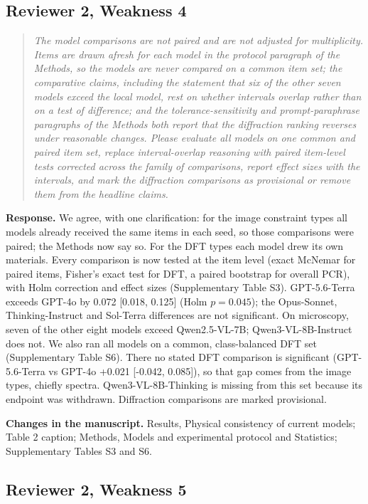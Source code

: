 \documentclass[11pt,a4paper]{article}
\newenvironment{reviewer}{\begin{quote}\itshape\small}{\end{quote}}
\begin{document}
\subsection*{Reviewer 2, Weakness 4}

\begin{reviewer}The model comparisons are not paired and are not adjusted for multiplicity. Items are drawn afresh for each model in the protocol paragraph of the Methods, so the models are never compared on a common item set; the comparative claims, including the statement that six of the other seven models exceed the local model, rest on whether intervals overlap rather than on a test of difference; and the tolerance-sensitivity and prompt-paraphrase paragraphs of the Methods both report that the diffraction ranking reverses under reasonable changes. Please evaluate all models on one common and paired item set, replace interval-overlap reasoning with paired item-level tests corrected across the family of comparisons, report effect sizes with the intervals, and mark the diffraction comparisons as provisional or remove them from the headline claims.\end{reviewer}

\textbf{Response.} We agree, with one clarification: for the image constraint types all models already received the same items in each seed, so those comparisons were paired; the Methods now say so. For the DFT types each model drew its own materials. Every comparison is now tested at the item level (exact McNemar for paired items, Fisher's exact test for DFT, a paired bootstrap for overall PCR), with Holm correction and effect sizes (Supplementary Table S3). GPT-5.6-Terra exceeds GPT-4o by 0.072 [0.018, 0.125] (Holm $p=0.045$); the Opus-Sonnet, Thinking-Instruct and Sol-Terra differences are not significant. On microscopy, seven of the other eight models exceed Qwen2.5-VL-7B; Qwen3-VL-8B-Instruct does not. We also ran all models on a common, class-balanced DFT set (Supplementary Table S6). There no stated DFT comparison is significant (GPT-5.6-Terra vs GPT-4o +0.021 [-0.042, 0.085]), so that gap comes from the image types, chiefly spectra. Qwen3-VL-8B-Thinking is missing from this set because its endpoint was withdrawn. Diffraction comparisons are marked provisional.

\textbf{Changes in the manuscript.} Results, Physical consistency of current models; Table 2 caption; Methods, Models and experimental protocol and Statistics; Supplementary Tables S3 and S6.

\subsection*{Reviewer 2, Weakness 5}
\end{document}
